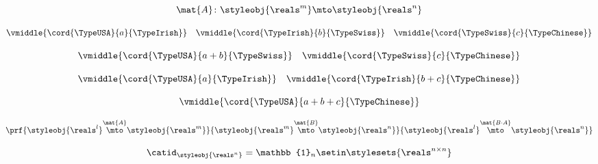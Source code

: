 \begin{forslides}
            
             \begin{equation}
                \label{eq:semicats-slides-126}
                \mat{A} \colon \styleobj{\reals^m} \mto \styleobj{\reals^n}
            \end{equation}
            
          
             \begin{equation}
                \label{eq:semicats-slides-127}
                \vmiddle{\cord{\TypeUSA}{a}{\TypeIrish}} \quad \vmiddle{\cord{\TypeIrish}{b}{\TypeSwiss}} \quad \vmiddle{\cord{\TypeSwiss}{c}{\TypeChinese}}
            \end{equation}
            
         
             \begin{equation}
                \label{eq:semicats-slides-128}
                \vmiddle{\cord{\TypeUSA}{a + b}{\TypeSwiss}} \quad \vmiddle{\cord{\TypeSwiss}{c}{\TypeChinese}}
            \end{equation}
            
                   \begin{equation}
                \label{eq:semicats-slides-129}
                \vmiddle{\cord{\TypeUSA}{a}{\TypeIrish}} \quad \vmiddle{\cord{\TypeIrish}{b + c}{\TypeChinese}}
            \end{equation}
            
            
             \begin{equation}
                \label{eq:semicats-slides-130}
                \vmiddle{\cord{\TypeUSA}{a + b + c}{\TypeChinese}}
            \end{equation}
            
           
             \begin{equation}
                \label{eq:semicats-slides-131}
                \prf{
            \styleobj{\reals^l} \overset{\mat{A}}{\mto} \styleobj{\reals^m}
        }{
            \styleobj{\reals^m} \overset{\mat{B}}{\mto} \styleobj{\reals^n}
        }{
            \styleobj{\reals^l} \overset{\mat{B \cdot A}}{\mto} \styleobj{\reals^n}
        }
            \end{equation}
            
        
             \begin{equation}
                \label{eq:semicats-slides-132}
                \catid_{\styleobj{\reals^n}} = \mathbb{1}_n \setin \stylesets{\reals^{n \times n}}
            \end{equation}
            

\end{forslides}
